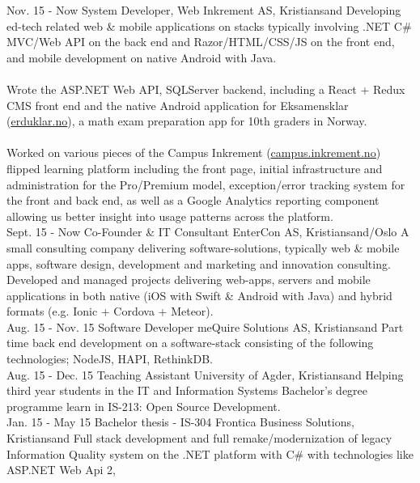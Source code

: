 \documentclass[]{cv-class}
\begin{document}
\begin{entrylist}
  \entry
    {Nov. 15 - Now}
    {System Developer, Web}
    {Inkrement AS, Kristiansand}
    {Developing ed-tech related web \& mobile applications on stacks typically involving .NET C\# MVC/Web API on the back end
    and Razor/HTML/CSS/JS on the front end, and mobile development on native Android with Java.\\\\
    Wrote the ASP.NET Web API, SQLServer backend, including a React + Redux CMS front end and the native Android
    application for Eksamensklar (\underline{\href{http://erduklar.no/}{erduklar.no}}),
    a math exam preparation app for 10th graders in Norway.\\\\
    Worked on various pieces of the Campus Inkrement 
    (\underline{\href{https://campus.inkrement.no}{campus.inkrement.no}})
    flipped learning platform including the front
    page, initial infrastructure and administration for the Pro/Premium model, exception/error tracking system for the front and
    back end, as well as a Google Analytics reporting component allowing us better insight into usage patterns across the
    platform.\\}
  \entry
    {Sept. 15 - Now}
    {Co-Founder \& IT Consultant}
    {EnterCon AS, Kristiansand/Oslo}
    {A small consulting company delivering software-solutions, typically web \& mobile apps, software design, 
    development and marketing and innovation consulting.\\
	Developed and managed projects delivering web-apps, servers and mobile applications in both native 
	(iOS with Swift \& Android with Java) and hybrid formats (e.g. Ionic + Cordova + Meteor). \\}
  \entry
    {Aug. 15 - Nov. 15}
    {Software Developer}
    {meQuire Solutions AS, Kristiansand}
    {Part time back end development on a software-stack consisting of the following
    technologies; NodeJS, HAPI, RethinkDB.\\}
  \entry
    {Aug. 15 - Dec. 15}
    {Teaching Assistant}
    {University of Agder, Kristiansand}
    {Helping third year students in the IT and Information Systems Bachelor's degree programme
    learn in IS-213: Open Source Development.\\}
  \entry
    {Jan. 15 - May 15}
    {Bachelor thesis - IS-304}
    {Frontica Business Solutions, Kristiansand}
    {Full stack development and full remake/modernization of legacy Information Quality system
    on the .NET platform with C\# with technologies like ASP.NET Web Api 2,
}
\end{entrylist}
\end{document}
